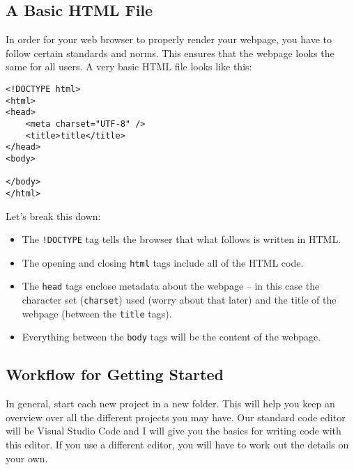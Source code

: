 \documentclass[english,11pt,a4paper]{report}
\begin{document}
\newpage
\subsection{A Basic HTML File}
In order for your web browser to properly render your webpage, you have to follow certain standards and norms. This ensures that the webpage looks the same for all users. A very basic HTML file looks like this:

\begin{lstlisting}
<!DOCTYPE html>
<html>
<head>
    <meta charset="UTF-8" />
    <title>title</title>
</head>
<body>
    
</body>
</html>
\end{lstlisting}

Let's break this down:
\begin{itemize}
    \item The \lstinline|!DOCTYPE| tag tells the browser that what follows is written in HTML.
    \item The opening and closing \lstinline|html| tags include all of the HTML code.
    \item The \lstinline|head| tags enclose metadata about the webpage -- in this case the character set (\lstinline|charset|) used (worry about that later) and the title of the webpage (between the \lstinline|title| tags).
    \item Everything between the \lstinline|body| tags will be the content of the webpage.
\end{itemize}

\subsection{Workflow for Getting Started}
In general, start each new project in a new folder. This will help you keep an overview over all the different projects you may have. Our standard code editor will be Visual Studio Code and I will give you the basics for writing code with this editor. If you use a different editor, you will have to work out the details on your own.
\end{document}
